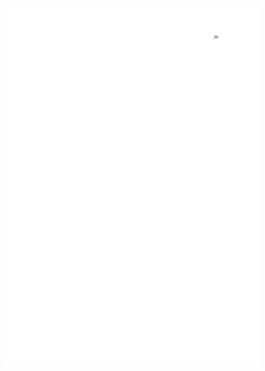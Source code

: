 \begin{figure}[p]
	\centering 
	\includegraphics[scale=0.7]{capitulos/resolucoes/cuni414/cuni414-29.pdf}
\end{figure}

